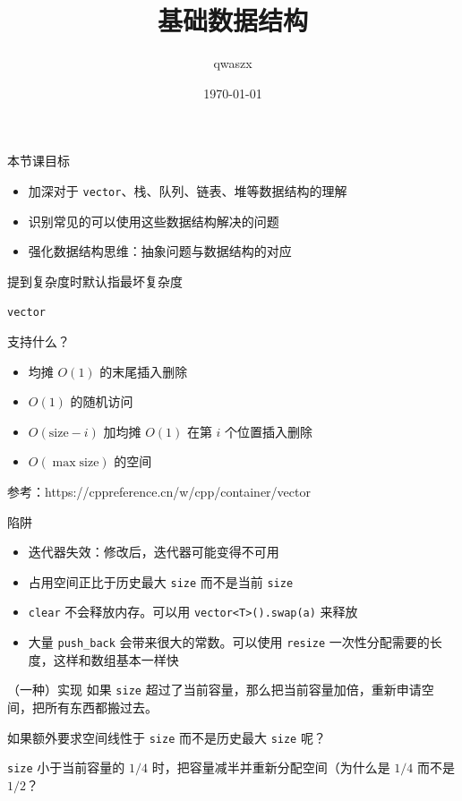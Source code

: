 \documentclass[11pt,aspectratio=169]{beamer}
\title{基础数据结构}
\author{qwaszx}
\date{\today}
\begin{document}
\begin{frame}
  \titlepage
\end{frame}

\begin{frame}{本节课目标}
\begin{itemize}
    \item 加深对于 \texttt{vector}、栈、队列、链表、堆等数据结构的理解
    \item 识别常见的可以使用这些数据结构解决的问题
    \item 强化数据结构思维：抽象问题与数据结构的对应
\end{itemize}

提到复杂度时默认指最坏复杂度
\end{frame}

\begin{frame}{\texttt{vector}}

支持什么？

\begin{itemize}
    \item 均摊 $O(1)$ 的末尾插入删除
    \item $O(1)$ 的随机访问\footnotemark
    \item $O(\mathrm{size}-i)$ 加均摊 $O(1)$ 在第 $i$ 个位置插入删除
    \item $O(\max\mathrm{size})$ 的空间
\end{itemize}

参考：https://cppreference.cn/w/cpp/container/vector

\end{frame}

\begin{frame}{陷阱}
\begin{itemize}
    \item 迭代器失效：修改后，迭代器可能变得不可用
    \item 占用空间正比于历史最大 \texttt{size} 而不是当前 \texttt{size}
    \item \texttt{clear} 不会释放内存。可以用 \texttt{vector<T>().swap(a)} 来释放 
    \item 大量 \texttt{push\_back} 会带来很大的常数。可以使用 \texttt{resize} 一次性分配需要的长度，这样和数组基本一样快
\end{itemize}
\end{frame}

\begin{frame}{（一种）实现}
   如果 \texttt{size} 超过了当前容量，那么把当前容量加倍，重新申请空间，把所有东西都搬过去。
   
   如果额外要求空间线性于 \texttt{size} 而不是历史最大 \texttt{size} 呢？

   \texttt{size} 小于当前容量的 $1/4$ 时，把容量减半并重新分配空间（为什么是 $1/4$ 而不是 $1/2$？
\end{frame}
\end{document}
